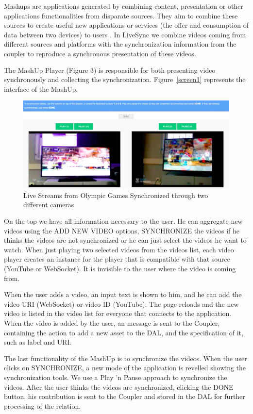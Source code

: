 Mashups are applications generated by combining content, presentation or other applications functionalities from disparate sources. They aim to combine these sources to create useful new applications or services (the offer and consumption of data between two devices) to users \cite{yu2008understanding}. In LiveSync we combine videos coming from different sources and platforms with the synchronization information from the coupler to reproduce a synchronous presentation of these videos.

The MashUp Player (Figure 3) is responsible for both presenting video synchronously and collecting the synchronization. Figure~\ref{screen1} represents the interface of the MashUp.

\begin{figure}[h]
	\centerline{\includegraphics[scale=0.2] {figure/screen}}
	\caption{Live Streams from Olympic Games Synchronized through two different cameras}
	\label{live_tvs}
\end{figure}

On the top we have all information necessary to the user. He can aggregate new videos using the ADD NEW VIDEO options, SYNCHRONIZE the videos if he thinks the videos are not synchronized or he can just select the videos he want to watch. When just playing two selected videos from the videos list, each video player creates an instance for the player that is compatible with that source (YouTube or WebSocket). It is invisible to the user where the video is coming from.

When the user adds a video, an input text is shown to him, and he can add the video URI (WebSocket) or video ID (YouTube). The page reloads and the new video is listed in the video list for everyone that connects to the application. When the video is added by the user, an message is sent to the Coupler, containing the action to add a new asset to the DAL, and the specification of it, such as label and URI.

The last functionality of the MashUp is to synchronize the videos. When the user clicks on SYNCHRONIZE, a new mode of the application is revelled showing the synchronization tools. We use a Play 'n Pause approach to synchronize the videos. After the user thinks the videos are synchronized, clicking the DONE button, his contribution is sent to the Coupler and stored in the DAL for further processing of the relation.

